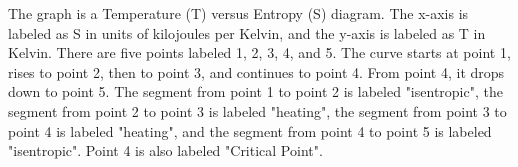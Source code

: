 The graph is a Temperature (T) versus Entropy (S) diagram. The x-axis is labeled as S in units of kilojoules per Kelvin, and the y-axis is labeled as T in Kelvin. There are five points labeled 1, 2, 3, 4, and 5. The curve starts at point 1, rises to point 2, then to point 3, and continues to point 4. From point 4, it drops down to point 5. The segment from point 1 to point 2 is labeled "isentropic", the segment from point 2 to point 3 is labeled "heating", the segment from point 3 to point 4 is labeled "heating", and the segment from point 4 to point 5 is labeled "isentropic". Point 4 is also labeled "Critical Point".